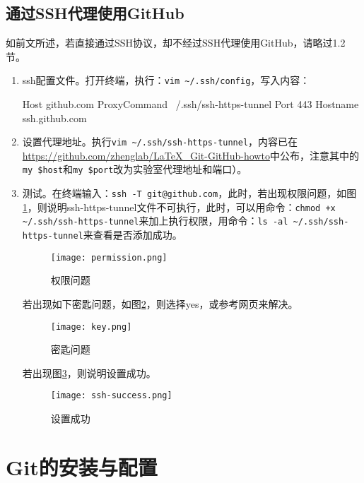 \documentclass[a4paper,12pt]{article}
\begin{document}
\subsection{通过SSH代理使用GitHub}

如前文所述，若直接通过SSH协议，却不经过SSH代理使用GitHub，请略过1.2节。

\begin{enumerate}
\item ssh配置文件。打开终端，执行：\lstinline|vim ~/.ssh/config|，写入内容：
\begin{plaintext}
Host github.com
ProxyCommand ~/.ssh/ssh-https-tunnel %
Port 443
Hostname ssh.github.com
\end{plaintext}
\item 设置代理地址。执行\lstinline|vim ~/.ssh/ssh-https-tunnel|，内容已在\url{https://github.com/zhenglab/LaTeX\_Git-GitHub-howto}中公布，注意其中的\verb|my $host|和\verb|my $port|改为实验室代理地址和端口）。
\item 测试。在终端输入：\lstinline|ssh -T git@github.com|，此时，若出现权限问题，如图\ref{fig:3}，则说明ssh-https-tunnel文件不可执行，此时，可以用命令：\lstinline|chmod +x ~/.ssh/ssh-https-tunnel|来加上执行权限，用命令：\lstinline|ls -al ~/.ssh/ssh-https-tunnel|来查看是否添加成功。
\begin{figure}[!htb] %
\centering
\texttt{[image: permission.png]}
\caption{权限问题}\label{fig:3}
\end{figure}

若出现如下密匙问题，如图\ref{fig:4}，则选择yes，或参考网页\cite{2:misc}来解决。
\begin{figure}[!htb] %
\texttt{[image: key.png]}
\centering\caption{密匙问题}\label{fig:4}
\end{figure}

若出现图\ref{fig:5}，则说明设置成功。
\begin{figure}[!htb] %
\texttt{[image: ssh-success.png]}
\centering\caption{设置成功}\label{fig:5}
\end{figure}
\end{enumerate}

\section{Git的安装与配置}
\end{document}
